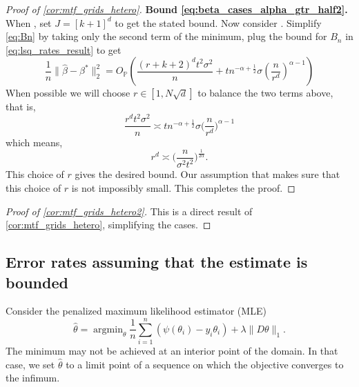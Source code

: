 \documentclass[ejs,noshowframe]{imsart}
\theoremstyle{plain}
\theoremstyle{definition}
\DeclareMathOperator*{\argmin}{argmin}
\renewcommand{\P}{\mathbb{P}}
\newcommand{\snorm}[1]{\lVert #1 \rVert}
\renewcommand{\hat}{\widehat}
\begin{document}
\begin{appendix}
\begin{proof}[Proof of \autoref{cor:mtf_grids_hetero}]
	\textbf{Bound \eqref{eq:beta_cases_alpha_gtr_half2}.}
	When , set $J=[k+1]^d$ to get the stated bound.
	Now consider .
	Simplify \eqref{eq:Bn} by taking only the 
	second 
	term of the minimum, plug the bound for $B_n$ in \eqref{eq:lsq_rates_result} 
	to get
	\begin{equation}
		\label{eq:mse_simp4}
		\frac{1}{n}\snorm{ \hat\beta - \beta^* }_2^2 
		= O_\P \left( \frac{(r+k+2)^d t^2  \sigma^2}{n} 
		+ 
		t n^{-\alpha + \frac{1}{2}} \sigma \left(\frac{n}{r^d} \right)^{\alpha-1} 
		\right) 
	\end{equation}
	When possible we will choose $r \in [1, 
	N\sqrt{d}]$ 
	to balance the two terms above, that is,
	\[
	\frac{r^d t^2  \sigma^2}{n} \asymp t n^{-\alpha + \frac{1}{2}} \sigma 
	\big(\frac{n}{r^d} \big)^{\alpha-1}
	\]
which means,
	\[
	r^d \asymp \Big(\frac{n}{\sigma^2 t^2}  \Big)^{\frac{1}{2\alpha}}.
	\]
	This choice of $r$ gives the desired bound. Our assumption  that 
	 makes sure that this 
	choice of $r$ is not impossibly small.
	This completes the proof.
\end{proof}

\begin{proof}[Proof of \autoref{cor:mtf_grids_hetero2}]
This is a direct result of \autoref{cor:mtf_grids_hetero}, simplifying the 
cases.
\end{proof}


\subsection{Error rates assuming that the estimate is bounded}
\label{sec:app_mle_constrained}

Consider the penalized maximum likelihood estimator (MLE)
\begin{equation}
	\label{eq:mle}
	\hat\theta = \argmin_\theta \frac{1}{n} \sum_{i=1}^n (\psi(\theta_i) - y_i 
	\theta_i) + \lambda \|D \theta \|_1.
\end{equation}
The minimum may not be achieved at an interior point of the domain. In that 
case, we set $\hat \theta$ to a limit point of a sequence on which the 
objective converges to the infimum.


\end{appendix}
\end{document}
